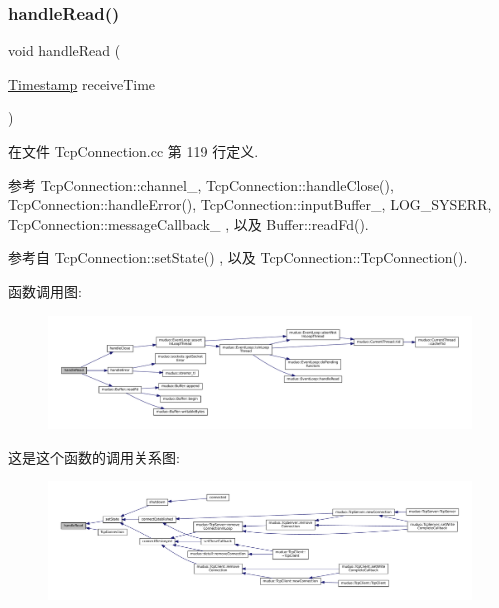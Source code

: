 \subsubsection{\texorpdfstring{handle\+Read()}{handleRead()}}
{\footnotesize\ttfamily void handle\+Read (\begin{DoxyParamCaption}\item[{\hyperlink{classmuduo_1_1Timestamp}{Timestamp}}]{receive\+Time }\end{DoxyParamCaption})\hspace{0.3cm}{\ttfamily [private]}}



在文件 Tcp\+Connection.\+cc 第 119 行定义.



参考 Tcp\+Connection\+::channel\+\_\+, Tcp\+Connection\+::handle\+Close(), Tcp\+Connection\+::handle\+Error(), Tcp\+Connection\+::input\+Buffer\+\_\+, L\+O\+G\+\_\+\+S\+Y\+S\+E\+RR, Tcp\+Connection\+::message\+Callback\+\_\+ , 以及 Buffer\+::read\+Fd().



参考自 Tcp\+Connection\+::set\+State() , 以及 Tcp\+Connection\+::\+Tcp\+Connection().

函数调用图\+:
\nopagebreak
\begin{figure}[H]
\begin{center}
\leavevmode
\includegraphics[width=350pt]{classmuduo_1_1TcpConnection_afca05707020dd916739c07555d4769a0_cgraph}
\end{center}
\end{figure}
这是这个函数的调用关系图\+:
\nopagebreak
\begin{figure}[H]
\begin{center}
\leavevmode
\includegraphics[width=350pt]{classmuduo_1_1TcpConnection_afca05707020dd916739c07555d4769a0_icgraph}
\end{center}
\end{figure}
\mbox{\label{classmuduo_1_1TcpConnection_ae1d79ff6580eaced59a900144818150d}} 
